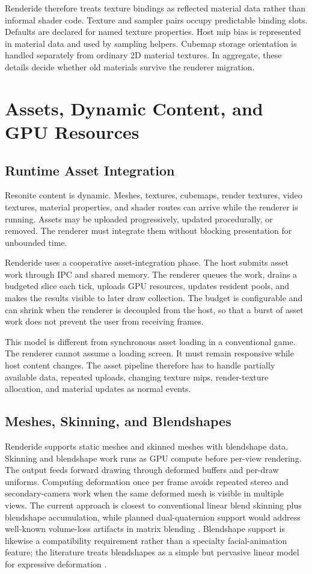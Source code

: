\documentclass[acmtog,screen,nonacm]{acmart}
\begin{document}
Renderide therefore treats texture bindings as reflected material data rather than informal shader code. Texture and sampler pairs occupy predictable binding slots. Defaults are declared for named texture properties. Host mip bias is represented in material data and used by sampling helpers. Cubemap storage orientation is handled separately from ordinary 2D material textures. In aggregate, these details decide whether old materials survive the renderer migration.

\section{Assets, Dynamic Content, and GPU Resources}

\subsection{Runtime Asset Integration}

Resonite content is dynamic. Meshes, textures, cubemaps, render textures, video textures, material properties, and shader routes can arrive while the renderer is running. Assets may be uploaded progressively, updated procedurally, or removed. The renderer must integrate them without blocking presentation for unbounded time.

Renderide uses a cooperative asset-integration phase. The host submits asset work through IPC and shared memory. The renderer queues the work, drains a budgeted slice each tick, uploads GPU resources, updates resident pools, and makes the results visible to later draw collection. The budget is configurable and can shrink when the renderer is decoupled from the host, so that a burst of asset work does not prevent the user from receiving frames.

This model is different from synchronous asset loading in a conventional game. The renderer cannot assume a loading screen. It must remain responsive while host content changes. The asset pipeline therefore has to handle partially available data, repeated uploads, changing texture mips, render-texture allocation, and material updates as normal events.

\subsection{Meshes, Skinning, and Blendshapes}

Renderide supports static meshes and skinned meshes with blendshape data. Skinning and blendshape work runs as GPU compute before per-view rendering. The output feeds forward drawing through deformed buffers and per-draw uniforms. Computing deformation once per frame avoids repeated stereo and secondary-camera work when the same deformed mesh is visible in multiple views. The current approach is closest to conventional linear blend skinning plus blendshape accumulation, while planned dual-quaternion support would address well-known volume-loss artifacts in matrix blending \citep{kavan2008dqs}. Blendshape support is likewise a compatibility requirement rather than a specialty facial-animation feature; the literature treats blendshapes as a simple but pervasive linear model for expressive deformation \citep{lewis2014blendshapes}.
\end{document}
